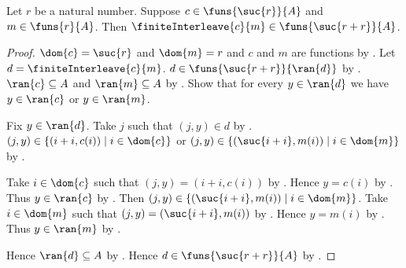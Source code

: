 \begin{proposition}\label{finite_interleave_typed}
    Let $r$ be a natural number.
    Suppose $c\in\funs{\suc{r}}{A}$ and $m\in\funs{r}{A}$.
    Then $\finiteInterleave{c}{m}\in\funs{\suc{r+r}}{A}$.
\end{proposition}
\begin{proof}
    $\dom{c}=\suc{r}$ and $\dom{m}=r$ and
        $c$ and $m$ are functions by .
    Let $d=\finiteInterleave{c}{m}$.
    $d\in\funs{\suc{r+r}}{\ran{d}}$
        by .
    $\ran{c}\subseteq A$ and $\ran{m}\subseteq A$ by .
    Show that for every $y\in\ran{d}$ we have
        $y\in\ran{c}$ or $y\in\ran{m}$.
    \begin{subproof}
        Fix $y\in\ran{d}$.
        Take $j$ such that $(j,y)\in d$ by .
        $(j,y)\in\{(i+i,c(i))\mid i\in\dom{c}\}$ or
            $(j,y)\in\{(\suc{i+i},m(i))\mid i\in\dom{m}\}$
            by .
        \begin{byCase}
            Take $i\in\dom{c}$ such that $(j,y)=(i+i,c(i))$
                by \auto.
            Hence $y=c(i)$ by .
            Thus $y\in\ran{c}$ by .
            Then $(j,y)\in
                \{(\suc{i+i},m(i))\mid i\in\dom{m}\}$.
            Take $i\in\dom{m}$ such that
                $(j,y)=(\suc{i+i},m(i))$ by \auto.
            Hence $y=m(i)$ by .
            Thus $y\in\ran{m}$ by .
        \end{byCase}
    \end{subproof}
    Hence $\ran{d}\subseteq A$ by .
    Hence $d\in\funs{\suc{r+r}}{A}$ by .
\end{proof}
